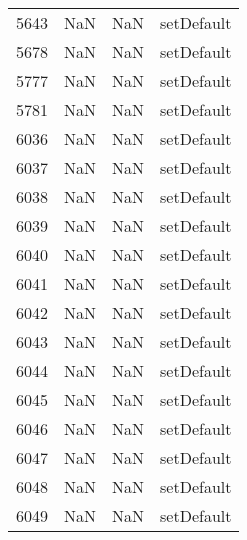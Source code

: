 \begin{tabular}{llll}
5643 &                   NaN &                        NaN &                                setDefault \\
5678 &                   NaN &                        NaN &                                setDefault \\
5777 &                   NaN &                        NaN &                                setDefault \\
5781 &                   NaN &                        NaN &                                setDefault \\
6036 &                   NaN &                        NaN &                                setDefault \\
6037 &                   NaN &                        NaN &                                setDefault \\
6038 &                   NaN &                        NaN &                                setDefault \\
6039 &                   NaN &                        NaN &                                setDefault \\
6040 &                   NaN &                        NaN &                                setDefault \\
6041 &                   NaN &                        NaN &                                setDefault \\
6042 &                   NaN &                        NaN &                                setDefault \\
6043 &                   NaN &                        NaN &                                setDefault \\
6044 &                   NaN &                        NaN &                                setDefault \\
6045 &                   NaN &                        NaN &                                setDefault \\
6046 &                   NaN &                        NaN &                                setDefault \\
6047 &                   NaN &                        NaN &                                setDefault \\
6048 &                   NaN &                        NaN &                                setDefault \\
6049 &                   NaN &                        NaN &                                setDefault \\

\end{tabular}
